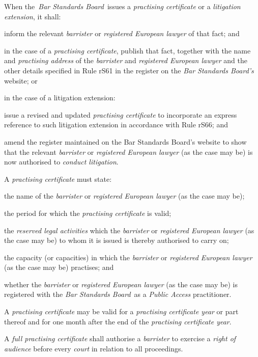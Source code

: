 When the~\emph{Bar Standards Board}~issues a \emph{practising
certificate} or a \emph{litigation extension}, it shall:\nl\item inform the relevant \emph{barrister} or \emph{registered European
lawyer} of that fact; and
\item in the case of a \emph{practising certificate}, publish that fact,
together with the name and \emph{practising address} of the
\emph{barrister} and \emph{registered European lawyer} and the other
details specified in Rule rS61 in the register on the \emph{Bar
Standards Board's} website; or
\item in the case of a litigation extension:
\al
\item issue a revised and updated \emph{practising certificate} to
incorporate an express reference to such litigation extension in
accordance with Rule rS66; and

\item amend the register maintained on the Bar Standards Board's website to
show that the relevant \emph{barrister} or \emph{registered European
lawyer} (as the case may be) is now authorised to \emph{conduct
litigation}.\la\ln
{}

A \emph{practising certificate} must state:\nl\item the name of the \emph{barrister} or \emph{registered European lawyer}
(as the case may be);
\item the period for which the \emph{practising certificate} is valid;
\item the \emph{reserved legal activities} which the \emph{barrister} or
\emph{registered European lawyer} (as the case may be) to whom it is
issued is thereby authorised to carry on;
\item the capacity (or capacities) in which the \emph{barrister} or
\emph{registered European lawyer} (as the case may be) practises; and
\item whether the \emph{barrister} or \emph{registered European lawyer} (as
the case may be) is registered with the \emph{Bar Standards Board}~as a
\emph{Public Access} practitioner.
\ln
{}

A \emph{practising certificate} may be valid for a \emph{practising
certificate year} or part thereof and for one month after the end of the
\emph{practising certificate year}.


A \emph{full practising certificate} shall authorise a \emph{barrister}
to exercise a \emph{right of audience} before every \emph{court} in
relation to all proceedings.

